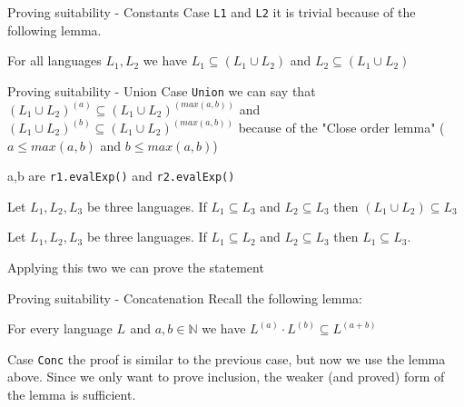 \documentclass{beamer}
\newcommand{\inline}[1]{\lstinline[language=Stainless,columns=fixed]|#1|}
\newcommand{\languagesymbol}{L}
\newcommand{\languagei}[1]{\languagesymbol_{#1}}
\newcommand{\pow}[2]{#1^{#2}}
\newcommand{\close}[2]{\pow{#1}{(#2)}}
\newcommand{\languageclose}[1]{\close{\languagesymbol}{#1}}
\newcommand{\concatop}{\cdot}
\newcommand{\nats}{\mathbb{N}}
\begin{document}
\begin{frame}{Proving suitability - Constants}
	 Case \inline{L1} and \inline{L2} it is trivial because of the following lemma.
			
	\begin{lemma}
		\label{lem:inUnionSubset}
		For all languages $\languagei{1}, \languagei{2}$ we have $\languagei{1} \subseteq (\languagei{1} \cup \languagei{2})$ and $\languagei{2} \subseteq (\languagei{1} \cup \languagei{2})$
	\end{lemma}
\end{frame}

\begin{frame}{Proving suitability - Union}
	Case \inline{Union} we can say that $\close{(\languagei{1} \cup \languagei{2})}{a} \subseteq \close{(\languagei{1} \cup \languagei{2})}{max(a,b)}$ and $\close{(\languagei{1} \cup \languagei{2})}{b} \subseteq \close{(\languagei{1} \cup \languagei{2})}{max(a,b)}$ because of the "Close order lemma" ($a \le max(a,b)$ and $b \le max(a,b)$)
	
	a,b are \inline{r1.evalExp()} and \inline{r2.evalExp()}
	
	\begin{lemma}
		\label{lem:unionSubset}
		Let $\languagei{1}, \languagei{2}, \languagei{3}$ be three languages. If $\languagei{1} \subseteq \languagei{3}$ and $\languagei{2} \subseteq \languagei{3}$ then $(\languagei{1} \cup \languagei{2})\subseteq \languagei{3}$
	\end{lemma}
	
	\begin{lemma}
		\label{lem:subsetOfTransitive}
		Let $\languagei{1}, \languagei{2}, \languagei{3}$ be three languages. If $\languagei{1} \subseteq \languagei{2}$ and  $\languagei{2} \subseteq \languagei{3}$ then  $\languagei{1} \subseteq \languagei{3}$.
	\end{lemma}
	
	
	Applying this two we can prove the statement
	
	
\end{frame}

\begin{frame}{Proving suitability - Concatenation}
	Recall the following lemma:
	\begin{lemma}
		For every language $\languagei{}$ and $a,b \in \nats$ we have $\languageclose{a} \concatop \languageclose{b} \subseteq \languageclose{a+b}$
	\end{lemma}
	
	Case \inline{Conc} the proof is similar to the previous case, but now we use the lemma above. Since we only want to prove inclusion, the weaker (and proved) form of the lemma is sufficient.
\end{frame}
\end{document}
